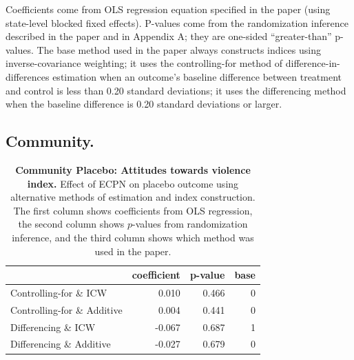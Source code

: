 \documentclass[
]{article}
\begin{document}
Coefficients come from OLS regression equation specified in the paper
(using state-level blocked fixed effects). P-values come from the
randomization inference described in the paper and in Appendix A; they
are one-sided ``greater-than'' p-values. The base method used in the
paper always constructs indices using inverse-covariance weighting; it
uses the controlling-for method of difference-in-differences estimation
when an outcome's baseline difference between treatment and control is
less than 0.20 standard deviations; it uses the differencing method when
the baseline difference is 0.20 standard deviations or larger.

\hypertarget{community.}{%
\subsection{Community.}\label{community.}}

\begin{table}[H]
\begin{center}
\label{tab:pl_vio_tab}
\caption{\textbf{Community Placebo: Attitudes towards violence index.} Effect of ECPN on placebo outcome using alternative methods of estimation and index construction. The first column shows coefficients from OLS regression, the second column shows $p$-values from randomization inference, and the third column shows which method was used in the paper.}
\smallskip

\begin{tabular}{l|r|r|r}
\hline
  & coefficient & p-value & base\\
\hline
Controlling-for \& ICW & 0.010 & 0.466 & 0\\
\hline
Controlling-for \& Additive & 0.004 & 0.441 & 0\\
\hline
Differencing \& ICW & -0.067 & 0.687 & 1\\
\hline
Differencing \& Additive & -0.027 & 0.679 & 0\\
\hline
\end{tabular}


\end{center}
\end{table}
\end{document}
